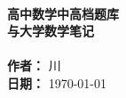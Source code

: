 \documentclass[a4paper,11pt]{report}
\begin{document}
 
\begin{titlepage}
    \center
    \vspace*{3cm} 
    \HRule{1.5pt} \\[0.4cm]
    { \huge \bfseries 高中数学中高档题库 \\ 与大学数学笔记 \\[0.4cm] }
    \HRule{1.5pt} \\[1.5cm]
    
    \Large \textbf{作者：} 川 \\[0.5cm]
    \Large \textbf{日期：} \today \\[2cm]
    
    \vfill
\end{titlepage}

\tableofcontents
\newpage






\end{document}
